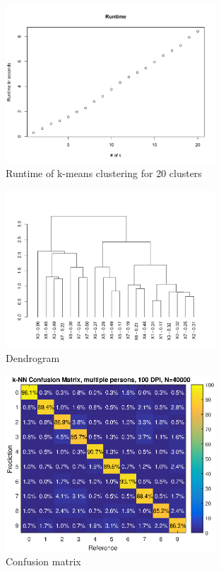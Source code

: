 \documentclass[10pt,a4paper]{article}
\begin{document}
\begin{figure}[H]
\centering
\includegraphics[width = 0.7\textwidth]{runtime.png}
\caption{Runtime of k-means clustering for 20 clusters}
\label{fig:runtime}
\end{figure}

\begin{figure}[H]
		\centering
		 \includegraphics[width = 0.7\textwidth]{dendogram_data_class.png}
		 \caption{Dendrogram}
		 \label{fig:dendo}
\end{figure}																						

\begin{figure}[H]
\centering
\includegraphics[width = 0.7\textwidth]{confmatkNN-multiAll-sig15-k1-n40000.eps}
\caption{Confusion matrix}
\label{fig:confusionMatrixAll}
\end{figure}
\end{document}
